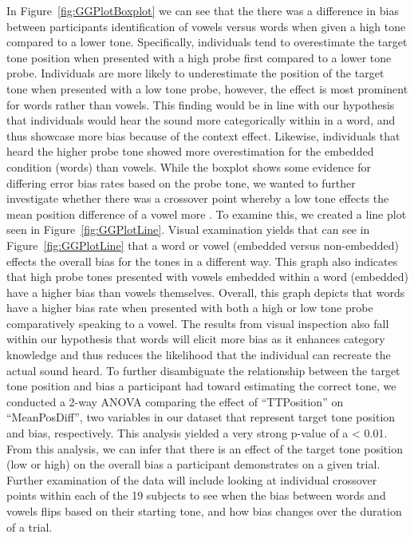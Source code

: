 \documentclass[
  man]{apa6}
\begin{document}
In Figure~\ref{fig:GGPlotBoxplot} we can see that the there was a difference in bias between participants identification of vowels versus words when given a high tone compared to a lower tone. Specifically, individuals tend to overestimate the target tone position when presented with a high probe first compared to a lower tone probe. Individuals are more likely to underestimate the position of the target tone when presented with a low tone probe, however, the effect is most prominent for words rather than vowels. This finding would be in line with our hypothesis that individuals would hear the sound more categorically within in a word, and thus showcase more bias because of the context effect. Likewise, individuals that heard the higher probe tone showed more overestimation for the embedded condition (words) than vowels. While the boxplot shows some evidence for differing error bias rates based on the probe tone, we wanted to further investigate whether there was a crossover point whereby a low tone effects the mean position difference of a vowel more . To examine this, we created a line plot seen in Figure~\ref{fig:GGPlotLine}. Visual examination yields that can see in Figure~\ref{fig:GGPlotLine} that a word or vowel (embedded versus non-embedded) effects the overall bias for the tones in a different way. This graph also indicates that high probe tones presented with vowels embedded within a word (embedded) have a higher bias than vowels themselves. Overall, this graph depicts that words have a higher bias rate when presented with both a high or low tone probe comparatively speaking to a vowel. The results from visual inspection also fall within our hypothesis that words will elicit more bias as it enhances category knowledge and thus reduces the likelihood that the individual can recreate the actual sound heard. To further disambiguate the relationship between the target tone position and bias a participant had toward estimating the correct tone, we conducted a 2-way ANOVA comparing the effect of ``TTPosition'' on ``MeanPosDiff'', two variables in our dataset that represent target tone position and bias, respectively. This analysis yielded a very strong p-value of a \textless{} 0.01. From this analysis, we can infer that there is an effect of the target tone position (low or high) on the overall bias a participant demonstrates on a given trial. Further examination of the data will include looking at individual crossover points within each of the 19 subjects to see when the bias between words and vowels flips based on their starting tone, and how bias changes over the duration of a trial.
\end{document}
